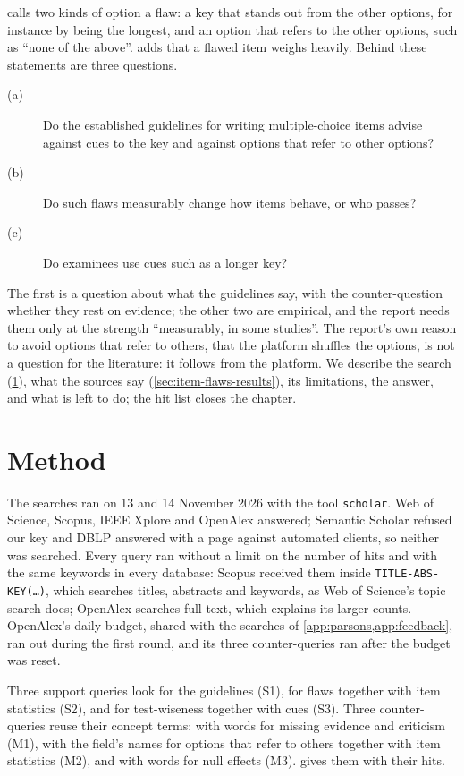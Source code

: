  calls two kinds of option a flaw: a key that stands out
from the other options, for instance by being the longest, and an option
that refers to the other options, such as \enquote{none of the above}.
 adds that a flawed item weighs heavily.  Behind these
statements are three questions.
\begin{description}
  \item[(a)] Do the established guidelines for writing multiple-choice
    items advise against cues to the key and against options that refer to
    other options?
  \item[(b)] Do such flaws measurably change how items behave, or who
    passes?
  \item[(c)] Do examinees use cues such as a longer key?
\end{description}
The first is a question about what the guidelines say, with the
counter-question whether they rest on evidence; the other two are
empirical, and the report needs them only at the strength
\enquote{measurably, in some studies}.  The report's own reason to avoid
options that refer to others, that the platform shuffles the options, is
not a question for the literature: it follows from the platform.  We
describe the search (\cref{sec:item-flaws-method}), what the sources say
(\cref{sec:item-flaws-results}), its limitations, the answer, and what is
left to do; the hit list closes the chapter.

\section{Method}
\label{sec:item-flaws-method}

The searches ran on 13 and 14 November 2026 with the tool
\texttt{scholar}.  Web of Science, Scopus, IEEE Xplore and OpenAlex
answered; Semantic Scholar refused our key and DBLP answered with a page
against automated clients, so neither was searched.  Every query ran
without a limit on the number of hits and with the same keywords in every
database: Scopus received them inside \texttt{TITLE-ABS-KEY(\dots)},
which searches titles, abstracts and keywords, as Web of Science's topic
search does; OpenAlex searches full text, which explains its larger
counts.  OpenAlex's daily budget, shared with the searches of
\cref{app:parsons,app:feedback}, ran out during the first round, and its
three counter-queries ran after the budget was reset.

Three support queries look for the guidelines (S1), for flaws together
with item statistics (S2), and for test-wiseness together with cues (S3).
Three counter-queries reuse their concept terms: with words for missing
evidence and criticism (M1), with the field's names for options that refer
to others together with item statistics (M2), and with words for null
effects (M3).   gives them with their
hits.

